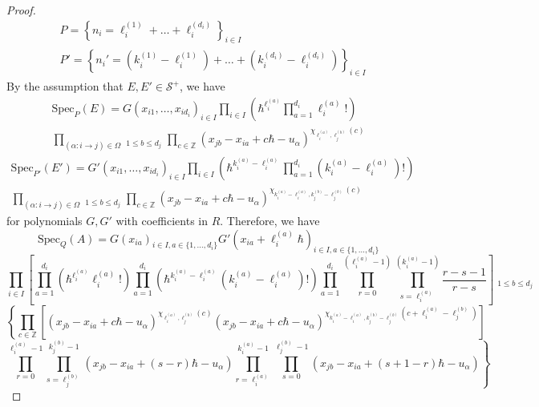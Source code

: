 \documentclass{amsart}
\def\BZ{{\mathbb{Z}}}
\def\CS{{\mathcal{S}}}
\def\edge{\Omega}
\def\ring{R}
\begin{document}
\begin{proof}
\begin{align*}
&P = \left\{n_i = \ell_i^{(1)} + \dots + \ell_i^{(d_i)} \right\}_{i \in I} \\
&P' = \left\{n_i' = (k_i^{(1)} - \ell_i^{(1)}) + \dots + (k_i^{(d_i)} - \ell_i^{(d_i)}) \right\}_{i \in I}
\end{align*}
By the assumption that $E,E' \in \CS^+$, we have
\begin{multline}
\label{eqn:1}
\text{Spec}_P(E) = G(x_{i1},\dots,x_{id_i})_{i \in I} \prod_{i \in I} \left(\hbar^{\ell_i^{(a)}} \prod_{a=1}^{d_i} \ell_i^{(a)}!\right) \\ \prod_{(\alpha : i \rightarrow j) \in \edge} \mathop{\prod_{1 \leq a \leq d_i}}_{1 \leq b \leq d_j} \prod_{c \in \BZ} \left(x_{jb} - x_{ia} + c\hbar - u_\alpha\right)^{\chi_{\ell_i^{(a)},\ell_j^{(b)}}(c)} 
\end{multline}
\begin{multline}
\label{eqn:2}
\text{Spec}_{P'}(E') = G'(x_{i1},\dots,x_{id_i})_{i \in I} \prod_{i \in I} \left(\hbar^{k_i^{(a)} - \ell_i^{(a)}} \prod_{a=1}^{d_i} (k_i^{(a)} - \ell_i^{(a)})!\right) \\ \prod_{(\alpha : i \rightarrow j) \in \edge} \mathop{\prod_{1 \leq a \leq d_i}}_{1 \leq b \leq d_j} \prod_{c \in \BZ} \left(x_{jb} - x_{ia} + c\hbar - u_\alpha\right)^{\chi_{k_i^{(a)} -\ell_i^{(a)},k_j^{(b)} - \ell_j^{(b)}}(c)} 
\end{multline}
for polynomials $G,G'$ with coefficients in $\ring$. Therefore, we have
\begin{equation}
\label{eqn:a}
\text{Spec}_Q(A) = G(x_{ia})_{i\in I, a\in \{1,\dots,d_i\}} G'(x_{ia}+\ell_i^{(a)}\hbar)_{i\in I, a\in \{1,\dots,d_i\}}
\end{equation}
$$
\prod_{i \in I} \left[ \prod_{a=1}^{d_i} \left( \hbar^{\ell_i^{(a)}}\ell_i^{(a)}!\right)  \prod_{a=1}^{d_i} \left(\hbar^{k_i^{(a)}-\ell_i^{(a)}}(k_i^{(a)} - \ell_i^{(a)})!\right) \prod_{a=1}^{d_i} \prod_{r=0}^{(\ell_i^{(a)}-1)} \prod_{s=\ell_i^{(a)}}^{(k_i^{(a)}-1)} \frac {r-s-1}{r-s} \right] \mathop{\prod_{1 \leq a \leq d_i}^{(\alpha : i \rightarrow j) \in \edge}}_{1 \leq b \leq d_j} 
$$
$$
\left\{\prod_{c \in \BZ} \left[ \left(x_{jb} - x_{ia} + c\hbar - u_\alpha\right)^{\chi_{\ell_i^{(a)},\ell_j^{(b)}}(c)} \left(x_{jb} - x_{ia} + c\hbar - u_\alpha\right)^{\chi_{k_i^{(a)} -\ell_i^{(a)},k_j^{(b)} - \ell_j^{(b)}}(c+\ell_i^{(a)}-\ell_j^{(b)})} \right] \right.
$$
$$
\left. \prod_{r=0}^{\ell_i^{(a)}-1} \prod_{s=\ell_j^{(b)}}^{k_j^{(b)}-1}  (x_{jb}-x_{ia}+(s-r)\hbar - u_\alpha) \prod_{r=\ell_i^{(a)}}^{k_i^{(a)}-1} \prod_{s=0}^{\ell_j^{(b)}-1} (x_{jb}-x_{ia}+(s+1-r)\hbar - u_\alpha) \right\}
$$
\end{proof}
\end{document}
